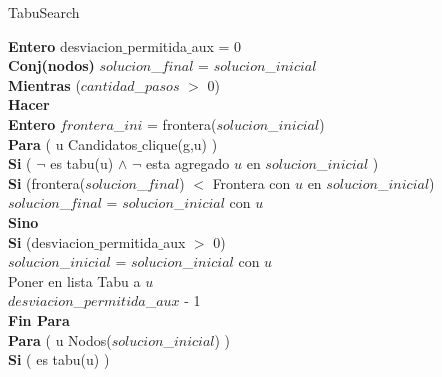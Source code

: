 \begin{algorithm}[H]
    \SetAlgoLined
    \caption{TabuSearch}
		
	\textbf{Entero} desviacion$\_$permitida$\_$aux = 0 \\
	\textbf{Conj(nodos)} $solucion$\_$final$ = $solucion$\_$inicial$ \\
		
	\textbf{Mientras} ($cantidad$\_$pasos$ $>$ 0) \\
	\hspace{4mm} \textbf{Hacer} \\
	\hspace{8mm}     \textbf{Entero} $frontera$\_$ini$ = frontera($solucion$\_$inicial$) \\
	\hspace{8mm} \textbf{Para} ( u \in Candidatos$\_$clique(g,u) ) \\
	\hspace{12mm} \textbf{Si} ( $\neg$ es tabu(u) $\wedge$ $\neg$ esta agregado $u$ en $solucion$\_$inicial$ ) \\
	\hspace{16mm} \textbf{Si} (frontera($solucion$\_$final$) $<$ Frontera con $u$ en $solucion$\_$inicial$) \\
	\hspace{20mm}  $solucion$\_$final$ = $solucion$\_$inicial$ con $u$ \\
	\hspace{16mm} \textbf{Sino} \\
	\hspace{20mm}  \textbf{Si} (desviacion$\_$permitida$\_$aux $>$ 0) \\
	\hspace{24mm} $solucion$\_$inicial$ = $solucion$\_$inicial$ con $u$ \\
	\hspace{24mm} Poner en lista Tabu a $u$ \\
	\hspace{24mm} $desviacion$\_$permitida$\_$aux$  - 1 \\
	\hspace{8mm} \textbf{Fin Para} \\
	\hspace{8mm} \textbf{Para} ( u \in Nodos($solucion$\_$inicial$) ) \\
	\hspace{12mm} \textbf{Si} ( \neg es tabu(u) ) \\

\end{algorithm}

